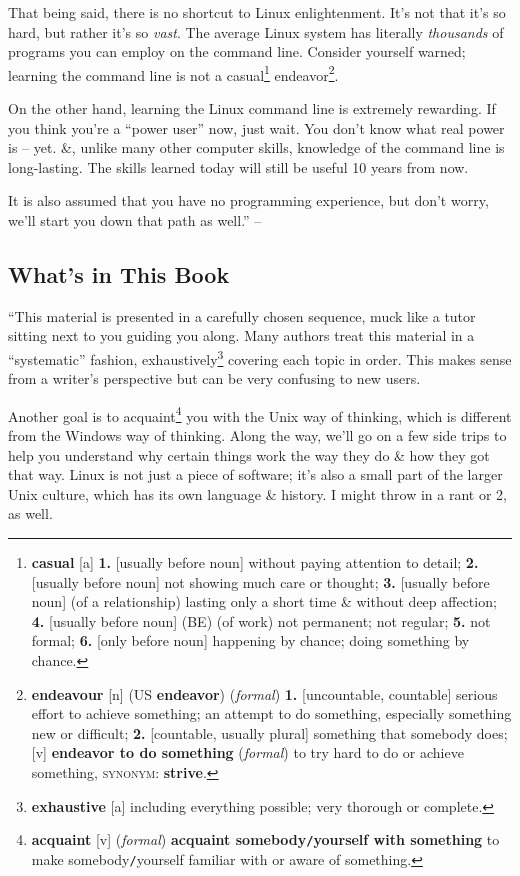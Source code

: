 \documentclass[oneside]{book}
\numberwithin{equation}{section}
\begin{document}
That being said, there is no shortcut to Linux enlightenment.  It's not that it's so hard, but rather it's so \textit{vast}. The average Linux system has literally \textit{thousands} of programs you can employ on the command line. Consider yourself warned; learning the command line is not a casual\footnote{\textbf{casual} [a] \textbf{1.} [usually before noun] without paying attention to detail; \textbf{2.} [usually before noun] not showing much care or thought; \textbf{3.} [usually before noun] (of a relationship) lasting only a short time \& without deep affection; \textbf{4.} [usually before noun] (BE) (of work) not permanent; not regular; \textbf{5.} not formal; \textbf{6.} [only before noun] happening by chance; doing something by chance.} endeavor\footnote{\textbf{endeavour} [n] (US \textbf{endeavor}) (\textit{formal}) \textbf{1.} [uncountable, countable] serious effort to achieve something; an attempt to do something, especially something new or difficult; \textbf{2.} [countable, usually plural] something that somebody does; [v] \textbf{endeavor to do something} (\textit{formal}) to try hard to do or achieve something, \textsc{synonym}: \textbf{strive}.}.

On the other hand, learning the Linux command line is extremely rewarding. If you think you're a ``power user'' now, just wait. You don't know what real power is -- yet. \&, unlike many other computer skills, knowledge of the command line is long-lasting. The skills learned today will still be useful 10 years from now. 

It is also assumed that you have no programming experience, but don't worry, we'll start you down that path as well.'' -- \cite[pp. 32--33]{Shotts2019}

\subsection*{What's in This Book}
``This material is presented in a carefully chosen sequence, muck like a tutor sitting next to you guiding you along. Many authors treat this material in a ``systematic'' fashion, exhaustively\footnote{\textbf{exhaustive} [a] including everything possible; very thorough or complete.} covering each topic in order. This makes sense from a writer's perspective but can be very confusing to new users.

Another goal is to acquaint\footnote{\textbf{acquaint} [v] (\textit{formal}) \textbf{acquaint somebody\texttt{/}yourself with something} to make somebody\texttt{/}yourself familiar with or aware of something.} you with the Unix way of thinking, which is different from the Windows way of thinking. Along the way, we'll go on a few side trips to help you understand why certain things work the way they do \& how they got that way. Linux is not just a piece of software; it's also a small part of the larger Unix culture, which has its own language \& history. I might throw in a rant or 2, as well.
\end{document}
